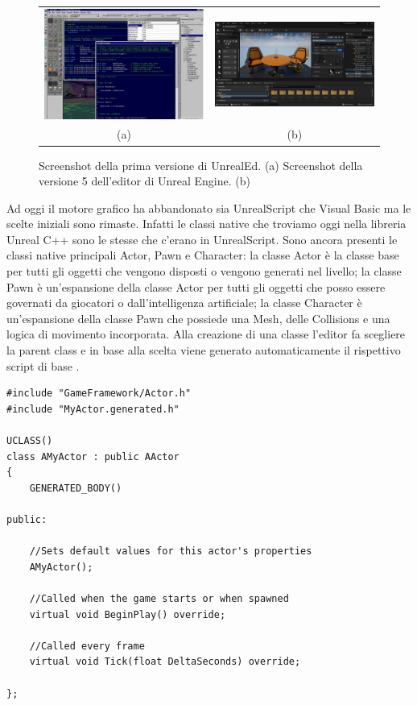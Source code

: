 \begin{figure}[!ht] 
    \begin{center}
    \begin{tabular}{c @{\hspace{1em}} c}
    \includegraphics[width=6.5cm]{figure/UnrelEngineEditor1.jpg} &
    \includegraphics[width=6.5cm]{figure/01-level-editor-windows.png} \\
     (a) & (b)
    \end{tabular}
    \end{center}
    \caption{Screenshot della prima versione di UnrealEd. (a) Screenshot della versione 5 dell'editor di Unreal Engine. (b)} \label{fig:figura-doppia}
\end{figure}

Ad oggi il motore grafico ha abbandonato sia UnrealScript che Visual Basic ma le scelte iniziali sono rimaste.
%
Infatti le classi native che troviamo oggi nella libreria Unreal C++ sono le stesse che c'erano in UnrealScript.
%
Sono ancora presenti le classi native principali Actor, Pawn e Character: la classe Actor è la classe base per tutti gli oggetti che vengono disposti o vengono generati nel livello; la classe Pawn è un'espansione della classe Actor per tutti gli oggetti che posso essere governati da giocatori o dall'intelligenza artificiale; la classe Character è un'espansione della classe Pawn che possiede una Mesh, delle Collisions e una logica di movimento incorporata. 
%
Alla creazione di una classe l'editor fa scegliere la parent class e in base alla scelta viene generato automaticamente il rispettivo script di base \cite{UProgrIntro}.

\begin{lstlisting}[caption = File header generato alla creazione di un Actor]
#include "GameFramework/Actor.h"
#include "MyActor.generated.h"

UCLASS()
class AMyActor : public AActor
{
    GENERATED_BODY()

public:

    //Sets default values for this actor's properties
    AMyActor();

    //Called when the game starts or when spawned
    virtual void BeginPlay() override;

    //Called every frame
    virtual void Tick(float DeltaSeconds) override;

};
\end{lstlisting}

